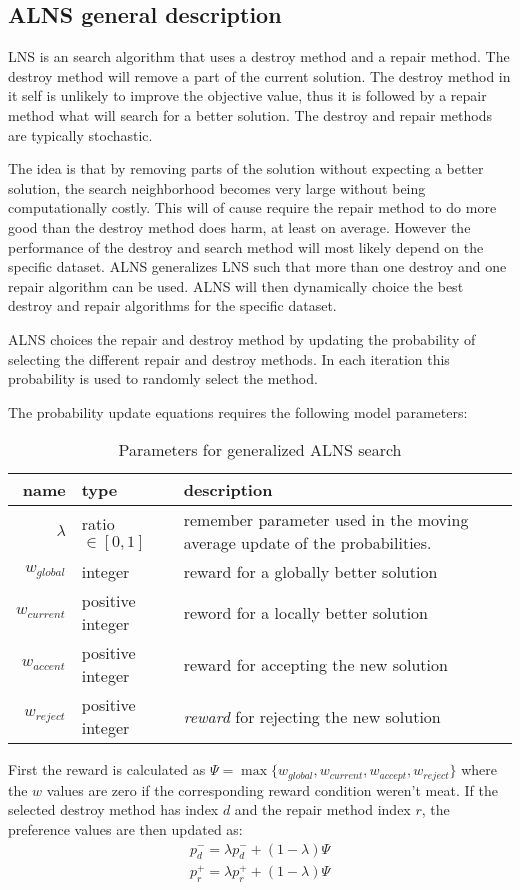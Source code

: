\subsection{ALNS general description}

LNS is an search algorithm that uses a destroy method and a repair method. The destroy method will remove a part of the current solution. The destroy method in it self is unlikely to improve the objective value, thus it is followed by a repair method what will search for a better solution. The destroy and repair methods are typically stochastic.

The idea is that by removing parts of the solution without expecting a better solution, the search neighborhood becomes very large without being computationally costly. This will of cause require the repair method to do more good than the destroy method does harm, at least on average. However the performance of the destroy and search method will most likely depend on the specific dataset. ALNS generalizes LNS such that more than one destroy and one repair algorithm can be used. ALNS will then dynamically choice the best destroy and repair algorithms for the specific dataset.

ALNS choices the repair and destroy method by updating the probability of selecting the different repair and destroy methods. In each iteration this probability is used to randomly select the method.

The probability update equations requires the following model parameters:

\begin{table}[H]
\centering
\begin{tabular}{r|p{2.5cm}|p{6cm}}
	name & type & description \\ \hline
	$\lambda$ & ratio $\in [0, 1]$ & remember parameter used in the moving average update of the probabilities. \\
	$w_{global}$ & integer & reward for a globally better solution \\
	$w_{current}$ & positive integer & reword for a locally better solution \\
	$w_{accent}$ & positive integer & reward for accepting the new solution \\
	$w_{reject}$ & positive integer & \textit{reward} for rejecting the new solution
\end{tabular}
\caption{Parameters for generalized ALNS search}
\end{table}

First the reward is calculated as $\Psi = \max\{w_{global}, w_{current}, w_{accept}, w_{reject}\}$ where the $w$ values are zero if the corresponding reward condition weren't meat. If the selected destroy method has index $d$ and the repair method index $r$, the preference values are then updated as:
\begin{align}
p_d^- = \lambda p_d^- + (1 - \lambda)\Psi \\
p_r^+ = \lambda p_r^+ + (1 - \lambda)\Psi
\end{align}

